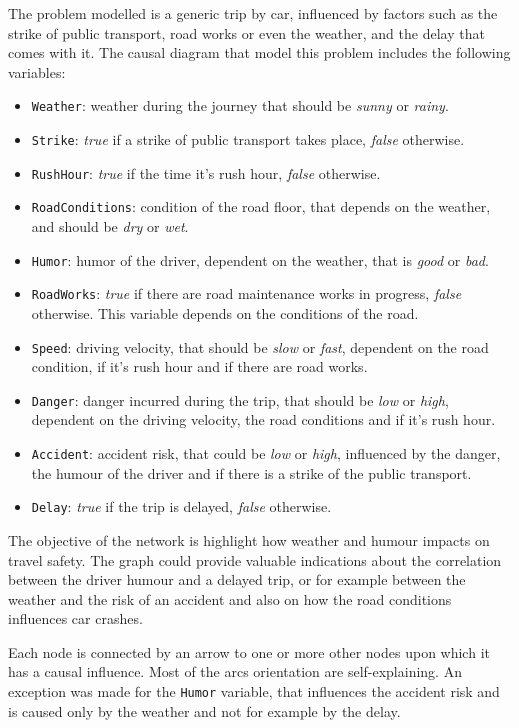 \documentclass[a4paper,12pt]{article} %
\begin{document}
The problem modelled is a generic trip by car, influenced by factors such as the strike of public transport, road works or even the weather, and the delay that comes with it. 
The causal diagram that model this problem includes the following variables:
\begin{itemize}
	\item \texttt{Weather}: weather during the journey that should be \textit{sunny} or \textit{rainy}.
	\item \texttt{Strike}: \textit{true} if a strike of public transport takes place, \textit{false} otherwise.
	\item \texttt{RushHour}: \textit{true} if the time it’s rush hour, \textit{false} otherwise.
	\item \texttt{RoadConditions}: condition of the road floor, that depends on the weather, and should be \textit{dry} or \textit{wet}.
	\item \texttt{Humor}: humor of the driver, dependent on the weather, that is \textit{good} or \textit{bad}.
	\item \texttt{RoadWorks}: \textit{true} if there are road maintenance works in progress, \textit{false} otherwise. This variable depends on the conditions of the road.
	\item \texttt{Speed}: driving velocity, that should be \textit{slow} or \textit{fast}, dependent on the road condition, if it’s rush hour and if there are road works.
	\item \texttt{Danger}: danger incurred during the trip, that should be \textit{low} or \textit{high}, dependent on the driving velocity, the road conditions and if it’s rush hour.
	\item \texttt{Accident}: accident risk, that could be \textit{low} or \textit{high}, influenced by the danger, the humour of the driver and if there is a strike of the public transport.
	\item \texttt{Delay}: \textit{true} if the trip is delayed, \textit{false} otherwise.
\end{itemize}

The objective of the network is highlight how weather and humour impacts on travel safety. 
The graph could provide valuable indications about the correlation between the driver humour and a delayed trip, or for example between the weather and the risk of an accident and also on how the road conditions influences car crashes.

Each node is connected by an arrow to one or more other nodes upon which it has a causal influence. Most of the arcs orientation are self-explaining. An exception was made for the \texttt{Humor} variable, that influences the accident risk and is caused only by the weather and not for example by the delay. 
\end{document}
